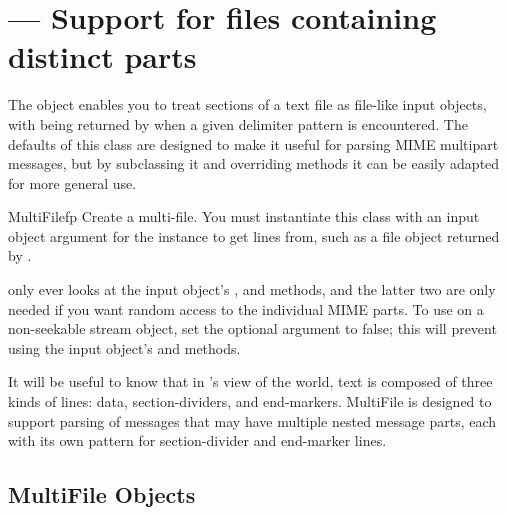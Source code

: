 \section{ ---
         Support for files containing distinct parts}



The  object enables you to treat sections of a text
file as file-like input objects, with  being returned by
 when a given delimiter pattern is encountered.  The
defaults of this class are designed to make it useful for parsing
MIME multipart messages, but by subclassing it and overriding methods 
it can be easily adapted for more general use.

\begin{classdesc}{MultiFile}{fp}
Create a multi-file.  You must instantiate this class with an input
object argument for the  instance to get lines from,
such as a file object returned by .

 only ever looks at the input object's
,  and  methods, and
the latter two are only needed if you want random access to the
individual MIME parts. To use  on a non-seekable
stream object, set the optional  argument to false; this
will prevent using the input object's  and
 methods.
\end{classdesc}

It will be useful to know that in 's view of the world, text
is composed of three kinds of lines: data, section-dividers, and
end-markers.  MultiFile is designed to support parsing of
messages that may have multiple nested message parts, each with its
own pattern for section-divider and end-marker lines.

\begin{seealso}
\end{seealso}


\subsection{MultiFile Objects \label{MultiFile-objects}}

